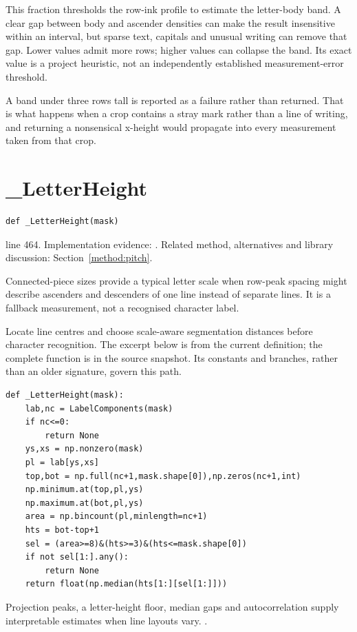 This fraction thresholds the row-ink profile to estimate the letter-body band. A clear gap between body and ascender densities can make the result insensitive within an interval, but sparse text, capitals and unusual writing can remove that gap. Lower values admit more rows; higher values can collapse the band. Its exact value is a project heuristic, not an independently established measurement-error threshold.


A band under three rows tall is reported as a failure rather than returned. That is what happens when a crop contains a stray mark rather than a line of writing, and returning a nonsensical x-height would propagate into every measurement taken from that crop.



\section{\_LetterHeight}\label{fn:segment:-LetterHeight}
\begin{lstlisting}[style=sig]
def _LetterHeight(mask)
\end{lstlisting}
 line 464. Implementation evidence: \cite{code2026}. Related method, alternatives and library discussion: Section~\ref{method:pitch}.


Connected-piece sizes provide a typical letter scale when row-peak spacing might describe ascenders and descenders of one line instead of separate lines. It is a fallback measurement, not a recognised character label.


Locate line centres and choose scale-aware segmentation distances before character recognition. The excerpt below is from the current definition; the complete function is in the source snapshot. Its constants and branches, rather than an older signature, govern this path.


\begin{lstlisting}[style=plain]
def _LetterHeight(mask):
    lab,nc = LabelComponents(mask)
    if nc<=0:
        return None
    ys,xs = np.nonzero(mask)
    pl = lab[ys,xs]
    top,bot = np.full(nc+1,mask.shape[0]),np.zeros(nc+1,int)
    np.minimum.at(top,pl,ys)
    np.maximum.at(bot,pl,ys)
    area = np.bincount(pl,minlength=nc+1)
    hts = bot-top+1
    sel = (area>=8)&(hts>=3)&(hts<=mask.shape[0])
    if not sel[1:].any():
        return None
    return float(np.median(hts[1:][sel[1:]]))
\end{lstlisting}
Projection peaks, a letter-height floor, median gaps and autocorrelation supply interpretable estimates when line layouts vary. \cite{postl1986,scipypeaks}.


